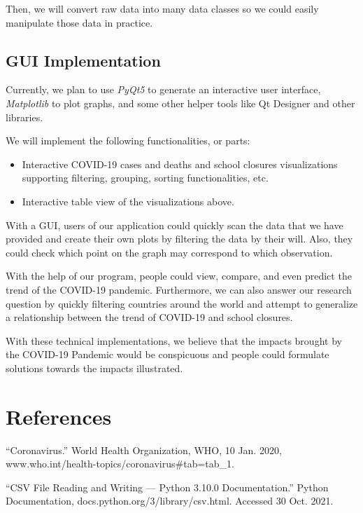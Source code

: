 \documentclass[fontsize=11pt]{article}
\begin{document}
Then, we will convert raw data into many data classes so we could easily manipulate those data in practice.

\subsection*{GUI Implementation}

Currently, we plan to use \emph{PyQt5} to generate an interactive user interface, \emph{Matplotlib} to plot graphs, and some other helper tools like Qt Designer and other libraries.

We will implement the following functionalities, or parts:

\begin{itemize}
    \item
        Interactive COVID-19 cases and deaths and school closures visualizations supporting filtering, grouping, sorting functionalities, etc.

    \item
        Interactive table view of the visualizations above.
\end{itemize}

With a GUI, users of our application could quickly scan the data that we have provided and create their own plots by filtering the data by their will. Also, they could check which point on the graph may correspond to which observation.

With the help of our program, people could view, compare, and even predict the trend of the COVID-19 pandemic. Furthermore, we can also answer our research question by quickly filtering countries around the world and attempt to generalize a relationship between the trend of COVID-19 and school closures.

With these technical implementations, we believe that the impacts brought by the COVID-19 Pandemic would be conspicuous and people could formulate solutions towards the impacts illustrated.

\newpage

\section*{References}

“Coronavirus.” World Health Organization, WHO, 10 Jan. 2020, www.who.int/health-topics/coronavirus\#tab=tab\_1.

“CSV File Reading and Writing — Python 3.10.0 Documentation.” Python Documentation, docs.python.org/3/library/csv.html. Accessed 30 Oct. 2021.
\end{document}
